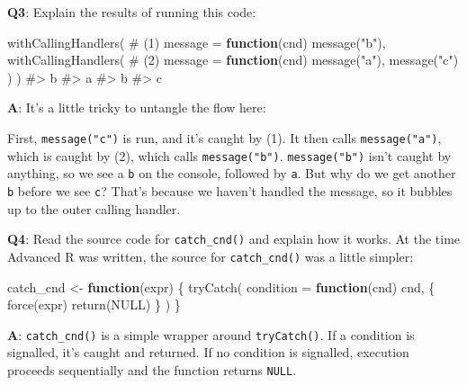 \documentclass[
]{krantz}
\makeatletter
\newenvironment{Shaded}{\begin{snugshade}}{\end{snugshade}}
\newcommand{\CommentTok}[1]{\textcolor[rgb]{0.56,0.35,0.01}{\textit{#1}}}
\newcommand{\ControlFlowTok}[1]{\textcolor[rgb]{0.13,0.29,0.53}{\textbf{#1}}}
\newcommand{\DataTypeTok}[1]{\textcolor[rgb]{0.13,0.29,0.53}{#1}}
\newcommand{\KeywordTok}[1]{\textcolor[rgb]{0.13,0.29,0.53}{\textbf{#1}}}
\newcommand{\NormalTok}[1]{#1}
\newcommand{\OtherTok}[1]{\textcolor[rgb]{0.56,0.35,0.01}{#1}}
\newcommand{\StringTok}[1]{\textcolor[rgb]{0.31,0.60,0.02}{#1}}
\newenvironment{kframe}{%
\medskip{}
\setlength{\fboxsep}{.8em}
 \def\at@end@of@kframe{}%
 \ifinner\ifhmode%
  \def\at@end@of@kframe{\end{minipage}}%
  \begin{minipage}{\columnwidth}%
 \fi\fi%
 \def\FrameCommand##1{\hskip\@totalleftmargin \hskip-\fboxsep
 \colorbox{shadecolor}{##1}\hskip-\fboxsep
     \hskip-\linewidth \hskip-\@totalleftmargin \hskip\columnwidth}%
 \MakeFramed {\advance\hsize-\width
   \@totalleftmargin\z@ \linewidth\hsize
   \@setminipage}}%
 {\par\unskip\endMakeFramed%
 \at@end@of@kframe}
\renewenvironment{Shaded}{\begin{kframe}}{\end{kframe}}
\renewcommand{\KeywordTok} [1]{\textcolor[rgb]{0.00,0.44,0.13}{{#1}}}
\renewcommand{\DataTypeTok}[1]{\textcolor[rgb]{0.56,0.13,0.00}{{#1}}}
\renewcommand{\StringTok}  [1]{\textcolor[rgb]{0.25,0.44,0.63}{{#1}}}
\renewcommand{\CommentTok} [1]{\textcolor[rgb]{0.38,0.63,0.69}{{#1}}}
\renewcommand{\OtherTok}   [1]{\textcolor[rgb]{0.00,0.44,0.13}{{#1}}}
\renewcommand{\NormalTok}  [1]{{#1}}
\makeatother
\begin{document}
\textbf{{Q3}}: Explain the results of running this code:

\begin{Shaded}
\begin{Highlighting}[]
\KeywordTok{withCallingHandlers}\NormalTok{(  }\CommentTok{# (1)}
  \DataTypeTok{message =} \ControlFlowTok{function}\NormalTok{(cnd) }\KeywordTok{message}\NormalTok{(}\StringTok{"b"}\NormalTok{),}
  \KeywordTok{withCallingHandlers}\NormalTok{(  }\CommentTok{# (2)}
    \DataTypeTok{message =} \ControlFlowTok{function}\NormalTok{(cnd) }\KeywordTok{message}\NormalTok{(}\StringTok{"a"}\NormalTok{),}
    \KeywordTok{message}\NormalTok{(}\StringTok{"c"}\NormalTok{)}
\NormalTok{  )}
\NormalTok{)}
\CommentTok{#> b}
\CommentTok{#> a}
\CommentTok{#> b}
\CommentTok{#> c}
\end{Highlighting}
\end{Shaded}

\textbf{{A}}: It's a little tricky to untangle the flow here:

First, \texttt{message("c")} is run, and it's caught by (1). It then calls \texttt{message("a")}, which is caught by (2), which calls \texttt{message("b")}. \texttt{message("b")} isn't caught by anything, so we see a \texttt{b} on the console, followed by \texttt{a}. But why do we get another \texttt{b} before we see \texttt{c}? That's because we haven't handled the message, so it bubbles up to the outer calling handler.

\textbf{{Q4}}: Read the source code for \texttt{catch\_cnd()} and explain how it works. At the time Advanced R was written, the source for \texttt{catch\_cnd()} was a little simpler:

\begin{Shaded}
\begin{Highlighting}[]
\NormalTok{catch_cnd <-}\StringTok{ }\ControlFlowTok{function}\NormalTok{(expr) \{}
  \KeywordTok{tryCatch}\NormalTok{(}
    \DataTypeTok{condition =} \ControlFlowTok{function}\NormalTok{(cnd) cnd,}
\NormalTok{    \{}
      \KeywordTok{force}\NormalTok{(expr)}
      \KeywordTok{return}\NormalTok{(}\OtherTok{NULL}\NormalTok{)}
\NormalTok{    \}}
\NormalTok{  )}
\NormalTok{\}}
\end{Highlighting}
\end{Shaded}

\textbf{{A}}: \texttt{catch\_cnd()} is a simple wrapper around \texttt{tryCatch()}. If a condition is signalled, it's caught and returned. If no condition is signalled, execution proceeds sequentially and the function returns \texttt{NULL}.
\end{document}
